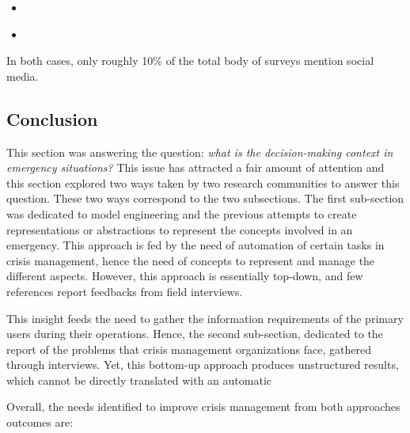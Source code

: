 \begin{itemize}
    \item \textcite{cobbDesigningDelugeUnderstanding2014}
    \item \textcite{tapiaTrustworthyTweetDeeper2013}
\end{itemize}

In both cases, only roughly 10\% of the total body of surveys mention social media.

\subsection*{Conclusion}
This section was answering the question: \emph{what is the decision-making context in emergency situations?}
This issue has attracted a fair amount of attention and this section explored two ways taken by two research communities to answer this question.
These two ways correspond to the two subsections.
The first sub-section was dedicated to model engineering and the previous attempts to create representations
or abstractions to represent the concepts involved in an emergency.
This approach is fed by the need of automation of certain tasks in crisis management, hence the need of concepts to represent and manage the different aspects.
However, this approach is essentially top-down, and few references report feedbacks from field interviews.

This insight feeds the need to gather the information requirements of the primary users during their operations.
Hence, the second sub-section, dedicated to the report of the problems that crisis management organizations face, gathered through interviews.
Yet, this bottom-up approach produces unstructured results, which cannot be directly translated with an automatic

Overall, the needs identified to improve crisis management from both approaches outcomes are:

